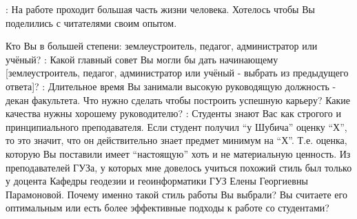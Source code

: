 \begin{drama}
	\maxspeaks: На работе проходит большая часть жизни человека. Хотелось чтобы Вы поделились с читателями своим опытом.

Кто Вы в большей степени: землеустроитель, педагог, администратор или учёный?
	\maxspeaks: Какой главный совет Вы могли бы дать начинающему [землеустроитель, педагог, администратор или учёный - выбрать из предыдущего ответа]?
	\maxspeaks: Длительное время Вы занимали высокую руководящую должность - декан факультета. Что нужно сделать чтобы построить успешную карьеру? Какие качества нужны хорошему руководителю?
	\maxspeaks: Студенты знают Вас как строгого и принципиального преподавателя. Если студент получил “у Шубича” оценку “Х”, то это значит, что он действительно знает предмет минимум на “Х”. Т.е. оценка, которую Вы поставили имеет “настоящую” хоть и не материальную ценность. Из преподавателей ГУЗа, у которых мне довелось учиться похожий стиль был только у доцента Кафедры геодезии и геоинформатики ГУЗ Елены Георгиевны Парамоновой. Почему именно такой стиль работы Вы выбрали? Вы считаете его оптимальным или есть более эффективные подходы к работе со студентами?


\end{drama}
